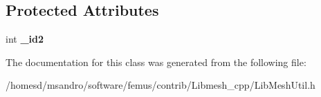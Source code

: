\subsection*{Protected Attributes}
\begin{DoxyCompactItemize}
\item 
\hypertarget{class_node_ext_abeeca035ab4e1bd1d12ef555c3314c53}{int {\bfseries \-\_\-id2}}\label{class_node_ext_abeeca035ab4e1bd1d12ef555c3314c53}

\end{DoxyCompactItemize}


The documentation for this class was generated from the following file\-:\begin{DoxyCompactItemize}
\item 
/homesd/msandro/software/femus/contrib/\-Libmesh\-\_\-cpp/Lib\-Mesh\-Util.\-h\end{DoxyCompactItemize}

